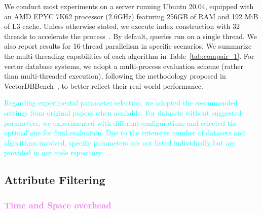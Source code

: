 \documentclass[sigconf, nonacm]{acmart}
\begin{document}
{	
	We conduct most experiments on a server running Ubuntu 20.04, equipped with an AMD EPYC 7K62 processor (2.6GHz) featuring 256GB of RAM and 192 MiB of L3 cache.  
	Unless otherwise stated, we execute index construction with 32 threads to accelerate the process~\cite{benchmarkindex}. By default, queries run on a single thread. We also report results for 16-thread parallelism in specific scenarios. We summarize the multi-threading capabilities of each algorithm in Table~\ref{tab:compair_1}. For vector database systems, we adopt a multi-process evaluation scheme (rather than multi-threaded execution), following the methodology proposed in VectorDBBench~\cite{VectorDBBench}, to better reflect their real-world performance.
	
	\textcolor{cyan}{
	Regarding experimental parameter selection, we adopted the recommended settings from original papers when available. For datasets without suggested parameters, we experimented with different configurations and selected the optimal one for final evaluation. Due to the extensive number of datasets and algorithms involved, specific parameters are not listed individually but are provided in our code repository.
}
	
	
	\subsection{Attribute Filtering}
	
	
	\subsubsection{\textcolor{violet}{Time and Space overhead}}
	\begin{figure}[t]
		\centering
		

\end{figure}}
\end{document}

